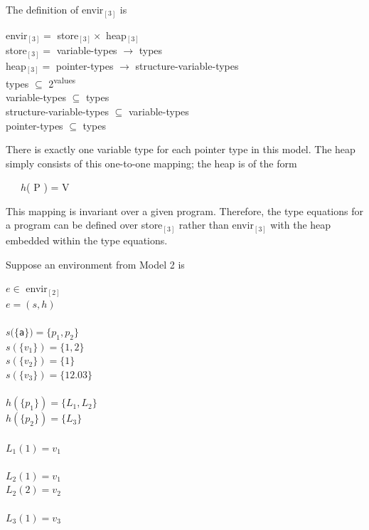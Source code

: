 \noindent
The definition of envir$_{[3]}$ is 

\goodbreak
\begin{specialcode}{}
\>envir$_{[3]} = $ store$_{[3]} \times $ heap$_{[3]}$\\
\>store$_{[3]} = $ variable-types $\rightarrow $ types\\
\>heap$_{[3]} = $ pointer-types $\rightarrow $ structure-variable-types\\
\>types ${\subseteq}$ 2\textsuperscript{values}\\
\>variable-types ${\subseteq}$ types\\
\>structure-variable-types ${\subseteq}$ variable-types\\
\>pointer-types ${\subseteq}$ types\\
\end{specialcode}


There is exactly one variable type for each pointer type in this
model. The heap simply consists of this one-to-one mapping; the heap
is of the form

{\ttfamily\mdseries
\ \ \ $h$( P ) = V}

This mapping is invariant over a given program. Therefore, the type
equations for a program can be defined over store$_{[3]}$ rather than
envir$_{[3]}$ with the heap embedded within the type equations.

Suppose an environment from Model 2 is 

\goodbreak
\begin{specialcode}{}
\> $e \in $ envir$_{[2]}$\\
\> $e = (s, h)$\\
\\
\> $s(\{$\texttt{a}$\}) = \{ p_1 , p_2\}$\\
\> $s(\{v_1\}) = \{1, 2\}$\\
\> $s(\{v_2\}) = \{1\}$\\
\> $s(\{v_3\}) = \{12.03\}$\\
\\
\> $h(\{p_1\}) = \{L_1, L_2\}$\\
\> $h(\{p_2\}) = \{L_3\}$\\
\\
\> $L_1(1) = v_1$\\
\\
\> $L_2(1) = v_1$\\
\> $L_2(2) = v_2$\\
\\
\> $L_3(1) = v_3$\\
\end{specialcode}

